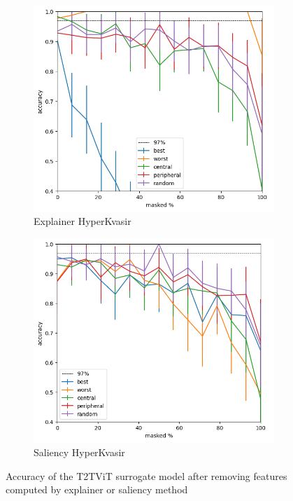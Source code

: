 \documentclass[magisterska,en]{pracamgr}
\begin{document}
\begin{figure}
\centering
\begin{subfigure}{.6\textwidth}
  \centering
  \includegraphics[width=.6\linewidth]{./images/t2t_vit_gastro_masking_explainer_patches_accuracy_half-0.png}
  \caption{Explainer HyperKvasir}
  \label{fig:sub1}
\end{subfigure}%
\begin{subfigure}{.6\textwidth}
  \centering
  \includegraphics[width=.6\linewidth]
{./images/t2t_vit_gastro_masking_saliency_patches_accuracy_half-0.png}
  \caption{Saliency HyperKvasir}
  \label{fig:sub2}
\end{subfigure}
\caption{Accuracy of the T2T\textunderscore ViT  surrogate model after removing features computed by explainer or saliency method}
\label{fig:T2T_ViT_Saliency_Explainer_HyperKvasir}
\end{figure}
\end{document}
